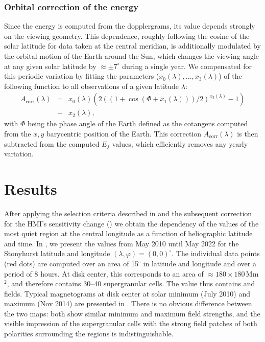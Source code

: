 \documentclass{aa}
\begin{document}
\subsubsection*{Orbital correction of the \fff{} 
energy}

Since the \fff
energy
is computed from the \los{} dopplergrams, its value depends strongly on the viewing geometry. This dependence,  roughly following the cosine of the solar latitude for data taken at the central meridian, is additionally modulated by the orbital motion of the Earth around the Sun, which changes the viewing angle at any given solar latitude by $\approx\pm7^\circ$ during a single year. We compensated for this periodic variation by fitting the parameters ($x_0(\lambda), ..., x_3(\lambda)$) of the following function to all observations of a given latitude $\lambda$:
\begin{eqnarray}
\label{eq:orbitcorr}
A_{\mbox{corr}}(\lambda) &=& x_0(\lambda) (  2 ( (1+\cos(\Phi+x_1(\lambda)))/2)^{x_3(\lambda)}-1   )\nonumber \\
&+&x_2(\lambda),
\end{eqnarray}
with $\Phi$ being the phase angle of the Earth defined as the cotangens computed from the $x,y$ barycentric position of the Earth.
This correction $A_{\mbox{corr}}(\lambda)$ is then subtracted from the computed 
$E_f$ values, which efficiently removes any yearly variation. 

\section{Results}\label{results}

After applying the selection criteria described in  
and the subsequent correction for the 
HMI's
sensitivity change () we obtain the dependency of the \brms{} values of the most quiet region at the central longitude as a function of heliographic latitude and time. In , we present the \brms{} values from May 2010 until May 2022 for the 
Stonyhurst latitude and longitude $(\lambda,\varphi) = (0,0)^\circ$.
The individual data points (red dots) are computed over an area of 15$^\circ$ in latitude and longitude and over a period of 8 hours. At disk center, this corresponds to an area of $\approx 180 \times 180$\,Mm$^2$, 
and therefore contains 30--40 supergranular cells. The \brms{} value thus contains
\NW{} and \IN{} fields.
Typical magnetograms at disk center at solar minimum (July 2010) and maximum (Nov 2014) are presented in . There is no obvious difference between the two maps: both show similar minimum and maximum field strengths, and the visible impression of the supergranular cells with the strong field patches of both polarities surrounding the \IN{} regions is indistinguishable.
\end{document}
